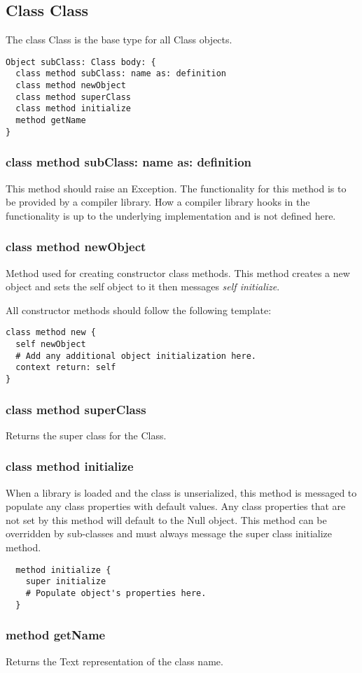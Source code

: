 \newpage
\subsection{Class Class}

The class Class is the base type for all Class objects.

\begin{lstlisting}
Object subClass: Class body: {
  class method subClass: name as: definition
  class method newObject
  class method superClass
  class method initialize
  method getName
}
\end{lstlisting}

\subsubsection{class method subClass: name as: definition}
This method should raise an Exception. The functionality for this method is to be provided by a compiler library. How a compiler library hooks in the functionality is up to the underlying implementation and is not defined here.

\subsubsection{class method newObject}
\label{sec:class_method_newobject}
Method used for creating constructor class methods. This method creates a new object and sets the self object to it then messages \textit{self initialize}.

All constructor methods should follow the following template:

\begin{lstlisting}
class method new {
  self newObject
  # Add any additional object initialization here.
  context return: self
}
\end{lstlisting}

\subsubsection{class method superClass}
Returns the super class for the Class.

\subsubsection{class method initialize}
When a library is loaded and the class is unserialized, this method is messaged to populate any class properties with default values. Any class properties that are not set by this method will default to the Null object. This method can be overridden by sub-classes and must always message the super class initialize method.

\begin{lstlisting}
  method initialize {
    super initialize
    # Populate object's properties here.
  }
\end{lstlisting}

\subsubsection{method getName}
Returns the Text representation of the class name.

